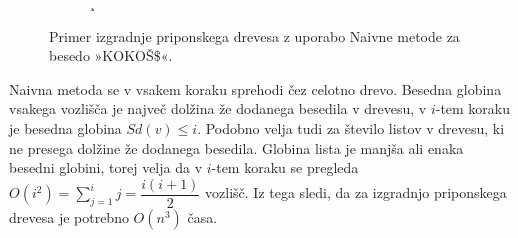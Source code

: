 \begin{figure}[htb]
\begin{subfigure}[t]{0.3\linewidth}
    \subcaption*{}
        
        \centering
        \label{fig:Naivna1}
    \end{subfigure}
    \hspace{0.5cm}
    \begin{subfigure}[t]{0.3\linewidth}¸
        \subcaption*{}
        
        \centering
        \label{fig:Naivna2}
    \end{subfigure}
    \hspace{0.5cm}
    \begin{subfigure}[t]{0.3\linewidth}
        \subcaption*{}
        
        \centering
        \label{fig:Naivna3}
    \end{subfigure}
    
    \begin{subfigure}[t]{0.3\linewidth}
        \subcaption*{}
        
        \centering
        \label{fig:Naivna4}
    \end{subfigure}
    \hspace{0.5cm}
    \begin{subfigure}[t]{0.3\linewidth}
        \subcaption*{}
        
        \centering
        \label{fig:Naivna5}
    \end{subfigure}
    \hspace{0.5cm}
    \begin{subfigure}[t]{0.3\textwidth}
        \subcaption*{}
        
        \centering
        \label{fig:Naivna6}
    \end{subfigure}

       \caption{Primer izgradnje priponskega drevesa z uporabo Naivne metode za besedo »KOKOŠ$\$$«.} 
        \label{fig:Naivna}
\end{figure}

Naivna metoda se v vsakem koraku sprehodi čez celotno drevo. Besedna globina vsakega vozlišča je največ dolžina že dodanega besedila v drevesu, v $i$-tem koraku je besedna globina $\textit{Sd}(v)\le i$. Podobno velja tudi za število listov v drevesu, ki ne presega dolžine že dodanega besedila. Globina lista je manjša ali enaka besedni globini, torej velja da v $i$-tem koraku se pregleda $O(i^2)=\sum_{j=1}^i j=  \dfrac{i(i+1)}{2}$ vozlišč. Iz tega sledi, da za izgradnjo priponskega drevesa je potrebno $O(n^3)$ časa.

